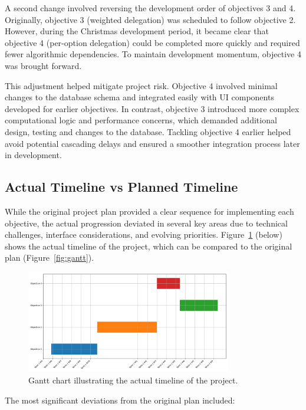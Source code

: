 A second change involved reversing the development order of objectives 3 and 4. Originally, objective 3 (weighted delegation) was scheduled to follow objective 2. However, during the Christmas development period, it became clear that objective 4 (per-option delegation) could be completed more quickly and required fewer algorithmic dependencies. To maintain development momentum, objective 4 was brought forward.

This adjustment helped mitigate project risk. Objective 4 involved minimal changes to the database schema and integrated easily with UI components developed for earlier objectives. In contrast, objective 3 introduced more complex computational logic and performance concerns, which demanded additional design, testing and changes to the database. Tackling objective 4 earlier helped avoid potential cascading delays and ensured a smoother integration process later in development.

\subsection{Actual Timeline vs Planned Timeline}
While the original project plan provided a clear sequence for implementing each objective, the actual progression deviated in several key areas due to technical challenges, interface considerations, and evolving priorities. Figure~\ref{fig:actual_gantt} (below) shows the actual timeline of the project, which can be compared to the original plan (Figure~\ref{fig:gantt}).
\begin{figure}[H]
    \centering
    \includegraphics[width=0.8\textwidth]{../common/actual_gantt.png}
    \caption{Gantt chart illustrating the actual timeline of the project.}
    \label{fig:actual_gantt}
\end{figure}

The most significant deviations from the original plan included:

